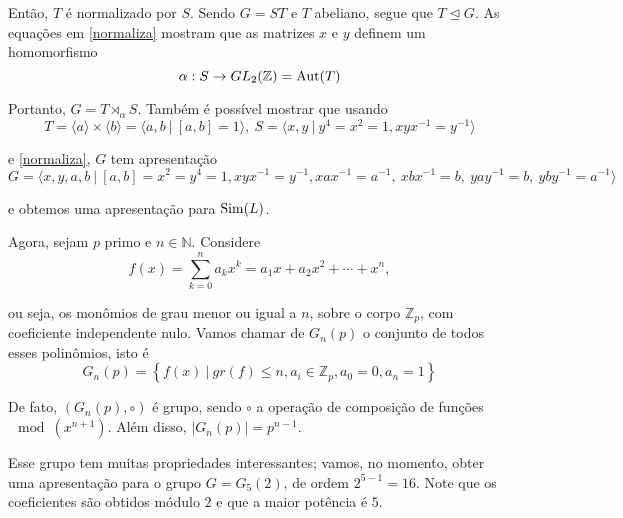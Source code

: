 	\par\vspace{0.3cm} Então, $T$ é normalizado por $S$. Sendo $G=ST$ e $T$ abeliano, segue que $T\trianglelefteq G$. As equações em \eqref{normaliza} mostram que as matrizes $x$ e $y$ definem um homomorfismo 
	\begin{equation*}
	\alpha: S\to GL_2(\mathbb{Z}) = \operatorname{Aut}(T)
	\end{equation*}
	\par\vspace{0.3cm} Portanto, $G = T\rtimes_{\alpha} S$. Também é possível mostrar que usando
	\begin{equation*}
	T = \langle a \rangle \times \langle b \rangle = \langle a,b \ | \ [a,b]=1 \rangle, \ S = \langle x,y \ | \ y^4=x^2=1, xyx^{-1} = y^{-1} \rangle
	\end{equation*}
	\par\vspace{0.3cm} e \eqref{normaliza}, $G$ tem apresentação
	\begin{equation*}
	G = \langle x,y,a,b \ | \ [a,b]=x^2=y^4=1,xyx^{-1} = y^{-1}, xax^{-1} = a^{-1}, \ xbx^{-1} = b, \ yay^{-1} = b, \ yby^{-1} = a^{-1} \rangle
	\end{equation*}
	\par\vspace{0.3cm} e obtemos uma apresentação para $\operatorname{Sim}(L)$.
	\par\vspace{0.3cm} Agora, sejam $p$ primo e $n\in\mathbb{N}$. Considere
	\begin{equation*}
	f(x) = \sum_{k=0}^{n}a_kx^k = a_1x + a_2x^2 + \cdots + x^n, 
	\end{equation*}
	\par\vspace{0.3cm} ou seja, os monômios de grau menor ou igual a $n$, sobre o corpo $\mathbb{Z}_p$, com coeficiente independente nulo. Vamos chamar de $G_n(p)$ o conjunto de todos esses polinômios, isto é
	\begin{equation*}
	G_n(p) = \left\{ f(x) \ | \ gr(f)\leq n, a_i\in\mathbb{Z}_p, a_0=0,a_n=1 \right\}
	\end{equation*}
	\par\vspace{0.3cm} De fato, $( G_n(p), \circ )$ é grupo, sendo $\circ$ a operação de composição de funções $\mod(x^{n+1})$. Além disso, $|G_n(p)| = p^{n-1}$.
	\par\vspace{0.3cm} Esse grupo tem muitas propriedades interessantes; vamos, no momento, obter uma apresentação para o grupo $G = G_5(2)$, de ordem $2^{5-1} = 16$. Note que os coeficientes são obtidos módulo $2$ e que a maior potência é $5$.
